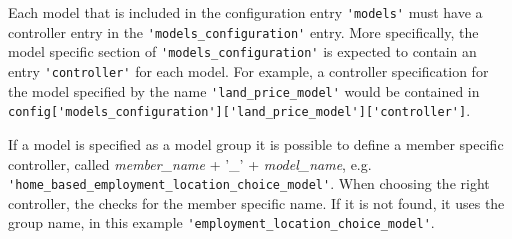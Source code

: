 Each model that is included in the configuration entry \verb|'models'| must have a
controller entry in the \verb|'models_configuration'| entry.  More specifically, the model specific
section of \verb|'models_configuration'| is expected to contain an entry \verb|'controller'|
for each model. For example, a controller specification for the model
specified by the name \verb|'land_price_model'| would be contained in\\
\verb|config['models_configuration']['land_price_model']['controller']|.

If a model is specified as a model group  it is possible to define a member specific controller, called 
{\em member_name} + '_' + {\em model_name}, e.g. \verb|'home_based_employment_location_choice_model'|.
When choosing the right controller, the  checks for the member specific name. If it is not found,
it uses the group name, in this example \verb|'employment_location_choice_model'|.

